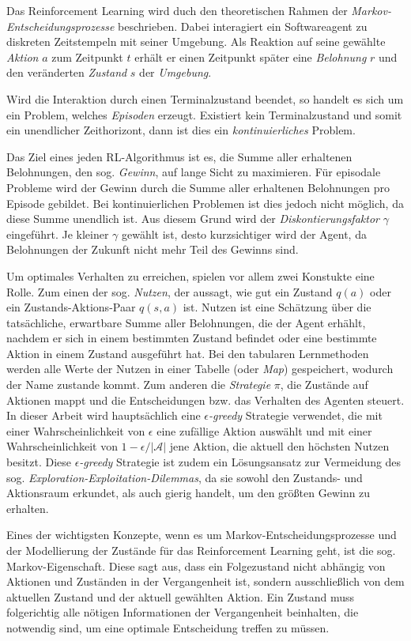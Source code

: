 Das Reinforcement Learning wird duch den theoretischen Rahmen der \textit{Markov-Entscheidungsprozesse} beschrieben. Dabei interagiert ein Softwareagent zu diskreten Zeitstempeln mit seiner Umgebung. Als Reaktion auf seine gewählte \textit{Aktion} $a$ zum Zeitpunkt $t$ erhält er einen Zeitpunkt später eine \textit{Belohnung} $r$ und den veränderten \textit{Zustand} $s$ der \textit{Umgebung}.
\par 
Wird die Interaktion durch einen Terminalzustand beendet, so handelt es sich um ein Problem, welches \textit{Episoden} erzeugt. Existiert kein Terminalzustand und somit ein unendlicher Zeithorizont, dann ist dies ein \textit{kontinuierliches} Problem.
\par 
Das Ziel eines jeden RL-Algorithmus ist es, die Summe aller erhaltenen Belohnungen, den sog. \textit{Gewinn}, auf lange Sicht zu maximieren. Für episodale Probleme wird der Gewinn durch die Summe aller erhaltenen Belohnungen pro Episode gebildet. Bei kontinuierlichen Problemen ist dies jedoch nicht möglich, da diese Summe unendlich ist. Aus diesem Grund wird der \textit{Diskontierungsfaktor} $\gamma$ eingeführt. Je kleiner $\gamma$ gewählt ist, desto \glqq kurzsichtiger\grqq{} wird der Agent, da Belohnungen der Zukunft nicht mehr Teil des Gewinns sind.
\par 
Um optimales Verhalten zu erreichen, spielen vor allem zwei Konstukte eine Rolle. Zum einen der sog. \textit{Nutzen}, der aussagt, wie \glqq gut\grqq{} ein Zustand $q(a)$ oder ein Zustands-Aktions-Paar $q(s,a)$ ist. \glqq Nutzen\grqq{} ist eine Schätzung über die tatsächliche, erwartbare Summe aller Belohnungen, die der Agent erhählt, nachdem er sich in einem bestimmten Zustand befindet oder eine bestimmte Aktion in einem Zustand ausgeführt hat. Bei den tabularen Lernmethoden werden alle Werte der Nutzen in einer \glqq Tabelle\grqq{} (oder \textit{Map}) gespeichert, wodurch der Name zustande kommt.  
Zum anderen die \textit{Strategie} $\pi$, die Zustände auf Aktionen mappt und die Entscheidungen bzw. das Verhalten des Agenten steuert. In dieser Arbeit wird hauptsächlich eine $\epsilon$\textit{-greedy} Strategie verwendet, die mit einer Wahrscheinlichkeit von $\epsilon$ eine zufällige Aktion auswählt und mit einer Wahrscheinlichkeit von $1-\epsilon / |\mathcal{A}|$ jene Aktion, die aktuell den höchsten Nutzen besitzt. Diese $\epsilon$\textit{-greedy} Strategie ist zudem ein Lösungsansatz zur Vermeidung des sog. \textit{Exploration-Exploitation-Dilemmas}, da sie sowohl den Zustands- und Aktionsraum erkundet, als auch gierig handelt, um den größten Gewinn zu erhalten.
\par 
Eines der wichtigsten Konzepte, wenn es um Markov-Entscheidungsprozesse und der Modellierung der Zustände für das Reinforcement Learning geht, ist die sog. Markov-Eigenschaft. Diese sagt aus, dass ein Folgezustand nicht abhängig von Aktionen und Zuständen in der Vergangenheit ist, sondern ausschließlich von dem aktuellen Zustand und der aktuell gewählten Aktion. Ein Zustand muss folgerichtig alle nötigen Informationen der Vergangenheit beinhalten, die notwendig sind, um eine optimale Entscheidung treffen zu müssen.